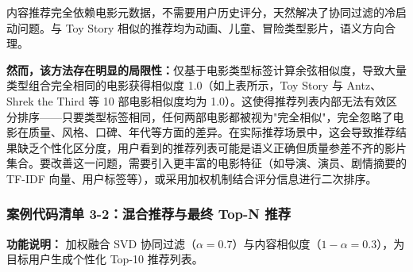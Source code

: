 \documentclass[12pt,a4paper]{ctexart}
\begin{document}
内容推荐完全依赖电影元数据，不需要用户历史评分，天然解决了协同过滤的冷启动问题。与 Toy Story 相似的推荐均为动画、儿童、冒险类型影片，语义方向合理。

\textbf{然而，该方法存在明显的局限性：}仅基于电影类型标签计算余弦相似度，导致大量类型组合完全相同的电影获得相似度 1.0（如上表所示，Toy Story 与 Antz、Shrek the Third 等 10 部电影相似度均为 1.0）。这使得推荐列表内部无法有效区分排序——只要类型标签相同，任何两部电影都被视为"完全相似"，完全忽略了电影在质量、风格、口碑、年代等方面的差异。在实际推荐场景中，这会导致推荐结果缺乏个性化区分度，用户看到的推荐列表可能是语义正确但质量参差不齐的影片集合。要改善这一问题，需要引入更丰富的电影特征（如导演、演员、剧情摘要的 TF-IDF 向量、用户标签等），或采用加权机制结合评分信息进行二次排序。

\subsubsection{案例代码清单 3-2：混合推荐与最终 Top-N 推荐}

\textbf{功能说明：} 加权融合 SVD 协同过滤（$\alpha=0.7$）与内容相似度（$1-\alpha=0.3$），为目标用户生成个性化 Top-10 推荐列表。
\end{document}
